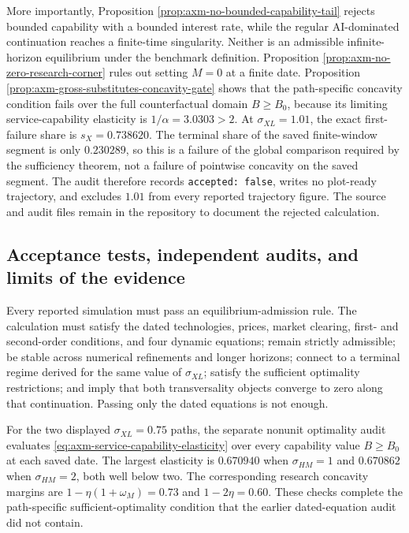 More importantly, Proposition \ref{prop:axm-no-bounded-capability-tail}
rejects bounded capability with a bounded interest rate, while the regular
AI-dominated continuation reaches a finite-time singularity. Neither is an admissible
infinite-horizon equilibrium under the benchmark definition. Proposition
\ref{prop:axm-no-zero-research-corner} rules out setting \(M=0\) at a finite
date. Proposition \ref{prop:axm-gross-substitutes-concavity-gate} shows that the
path-specific concavity condition fails over the full counterfactual domain
\(B\geq B_0\), because its limiting service-capability elasticity is
\(1/\alpha=3.0303>2\). At \(\sigma_{XL}=1.01\), the exact first-failure share
is \(s_X=0.738620\). The terminal share of the saved finite-window segment is
only \(0.230289\), so this is a failure of the global comparison required by
the sufficiency theorem, not a failure of pointwise concavity on the saved
segment. The audit therefore
records \texttt{accepted: false}, writes no plot-ready trajectory, and excludes
\(1.01\) from every reported trajectory figure. The source and audit files
remain in the repository to document the rejected calculation.

\subsection{Acceptance tests, independent audits, and limits of the evidence}

Every reported simulation must pass an equilibrium-admission rule. The
calculation must satisfy the dated technologies, prices, market clearing,
first- and second-order conditions, and four dynamic equations; remain strictly
admissible; be stable across numerical refinements and longer horizons; connect
to a terminal regime derived for the same value of \(\sigma_{XL}\); satisfy the
sufficient optimality restrictions; and imply that both transversality objects
converge to zero along that continuation. Passing only the dated equations is not
enough.

For the two displayed \(\sigma_{XL}=0.75\) paths, the separate nonunit
optimality audit evaluates \eqref{eq:axm-service-capability-elasticity} over
every capability value \(B\geq B_0\) at each saved date. The largest elasticity
is \(0.670940\) when \(\sigma_{HM}=1\) and \(0.670862\) when
\(\sigma_{HM}=2\), both well below two. The corresponding research concavity
margins are \(1-\eta(1+\omega_M)=0.73\) and \(1-2\eta=0.60\). These checks
complete the path-specific sufficient-optimality condition that the earlier
dated-equation audit did not contain.


